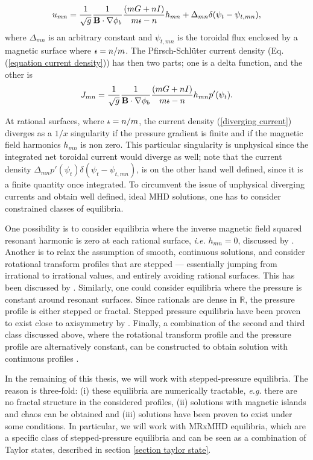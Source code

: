 \documentclass[my_thesis.tex]{subfiles}
\begin{document}
\begin{equation}
	u_{mn} = \frac{1}{\sqrt{g}}\frac{1}{\mathbf{B}\cdot\nabla\phi_b}\frac{(mG + nI)}{m\text{$\iota\!\!$-} - n}h_{mn} + \Delta_{mn}\delta(\psi_t-\psi_{t,mn}),
\end{equation}
where $\Delta_{mn}$ is an arbitrary constant and $\psi_{t,mn}$ is the toroidal flux enclosed by a magnetic surface where $\text{$\iota\!\!$-}=n/m$. The Pfirsch-Schl\"uter current density (Eq.(\ref{equation current density})) has then two parts; one is a delta function, and the other is
\begin{equation}
	J_{mn} = \frac{1}{\sqrt{g}}\frac{1}{\mathbf{B}\cdot\nabla\phi_b}\frac{(mG + nI)}{m\text{$\iota\!\!$-} - n}h_{mn}p'(\psi_t).\label{diverging current}
\end{equation}

At rational surfaces, where $\text{$\iota\!\!$-}=n/m$, the current density (\ref{diverging current}) diverges as a $1/x$ singularity if the pressure gradient is finite and if the magnetic field harmonics $h_{mn}$ is non zero. This particular singularity is unphysical since the integrated net toroidal current would diverge as well; note that the current density $\Delta_{mn} p'(\psi_t) \delta(\psi_t-\psi_{t,mn})$, is on the other hand well defined, since it is a finite quantity once integrated. To circumvent the issue of unphysical diverging currents and obtain well defined, ideal MHD solutions, one has to consider constrained classes of equilibria.

One possibility is to consider equilibria where the inverse magnetic field squared resonant harmonic is zero at each rational surface, \emph{i.e.} $h_{mn}=0$, discussed by \citet{Weitzner2014}. Another is to relax the assumption of smooth, continuous solutions, and consider rotational transform profiles that are stepped --- essentially jumping from irrational to irrational values, and entirely avoiding rational surfaces. This has been discussed by \citet{Loizu2015a}. Similarly, one could consider equilibria where the pressure is constant around resonant surfaces. Since rationals are dense in $\mathbb{R}$, the pressure profile is either stepped or fractal. Stepped pressure equilibria have been proven to exist close to axisymmetry by \citet{Bruno1996}. Finally, a combination of the second and third class discussed above, where the rotational transform profile and the pressure profile are alternatively constant, can be constructed to obtain solution with continuous profiles \citep{Hudson2017a}.

In the remaining of this thesis, we will work with stepped-pressure equilibria. The reason is three-fold: (i) these equilibria are numerically tractable, \textit{e.g.} there are no fractal structure in the considered profiles, (ii) solutions with magnetic islands and chaos can be obtained and (iii) solutions have been proven to exist under some conditions. In particular, we will work with \ac{MRxMHD} equilibria, which are a specific class of stepped-pressure equilibria and can be seen as a combination of Taylor states, described in section \ref{section taylor state}.
\end{document}
